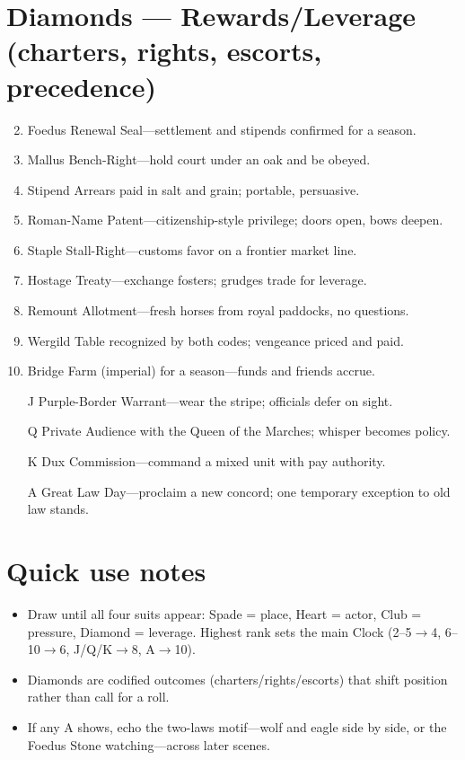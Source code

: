 \section*{Diamonds --- Rewards/Leverage (charters, rights, escorts, precedence)}
\begin{enumerate}
\setcounter{enumi}{1}
\item Foedus Renewal Seal---settlement and stipends confirmed for a season.
\item Mallus Bench-Right---hold court under an oak and be obeyed.
\item Stipend Arrears paid in salt and grain; portable, persuasive.
\item Roman-Name Patent---citizenship-style privilege; doors open, bows deepen.
\item Staple Stall-Right---customs favor on a frontier market line.
\item Hostage Treaty---exchange fosters; grudges trade for leverage.
\item Remount Allotment---fresh horses from royal paddocks, no questions.
\item Wergild Table recognized by both codes; vengeance priced and paid.
\item Bridge Farm (imperial) for a season---funds and friends accrue.
\item[J] Purple-Border Warrant---wear the stripe; officials defer on sight.
\item[Q] Private Audience with the Queen of the Marches; whisper becomes policy.
\item[K] Dux Commission---command a mixed unit with pay authority.
\item[A] Great Law Day---proclaim a new concord; one temporary exception to old law stands.
\end{enumerate}

\section*{Quick use notes}
\begin{itemize}
\item Draw until all four suits appear: Spade = place, Heart = actor, Club = pressure, Diamond = leverage. Highest rank sets the main Clock (2--5$\rightarrow$4, 6--10$\rightarrow$6, J/Q/K$\rightarrow$8, A$\rightarrow$10).
\item Diamonds are codified outcomes (charters/rights/escorts) that shift position rather than call for a roll.
\item If any A shows, echo the two-laws motif---wolf and eagle side by side, or the Foedus Stone watching---across later scenes.
\end{itemize}
